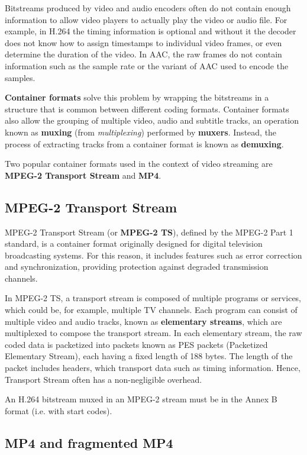 Bitstreams produced by video and audio encoders often do not contain enough information to allow video players to actually play the video or audio file. For example, in H.264 the timing information is optional and without it the decoder does not know how to assign timestamps to individual video frames, or even determine the duration of the video.\cite{h264itu} In AAC, the raw frames do not contain information such as the sample rate or the variant of AAC used to encode the samples.\cite{aac}

\textbf{Container formats} solve this problem by wrapping the bitstreams in a structure that is common between different coding formats. Container formats also allow the grouping of multiple video, audio and subtitle tracks, an operation known as \textbf{muxing} (from \textit{multiplexing}) performed by \textbf{muxers}. Instead, the process of extracting tracks from a container format is known as \textbf{demuxing}.

Two popular container formats used in the context of video streaming are \textbf{MPEG-2 Transport Stream} and \textbf{MP4}.

\subsection{MPEG-2 Transport Stream}
\label{sec:bg/containers/mpeg2ts}

MPEG-2 Transport Stream (or \textbf{MPEG-2 TS}), defined by the MPEG-2 Part 1 standard, is a container format originally designed for digital television broadcasting systems. For this reason, it includes features such as error correction and synchronization, providing protection against degraded transmission channels.

In MPEG-2 TS, a transport stream is composed of multiple programs or services, which could be, for example, multiple TV channels. Each program can consist of multiple video and audio tracks, known as \textbf{elementary streams}, which are multiplexed to compose the transport stream. In each elementary stream, the raw coded data is packetized into packets known as PES packets (Packetized Elementary Stream), each having a fixed length of 188 bytes. The length of the packet includes headers, which transport data such as timing information. Hence, Transport Stream often has a non-negligible overhead.\cite{mpeg2ts}

An H.264 bitstream muxed in an MPEG-2 stream must be in the Annex B format (i.e. with start codes).

\subsection{MP4 and fragmented MP4}
\label{sec:bg/containers/mp4}

